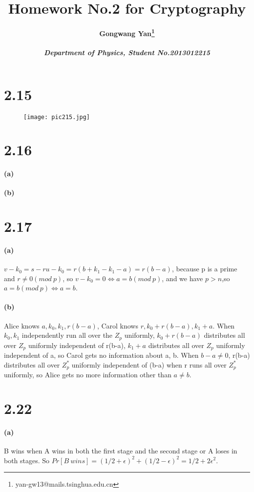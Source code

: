 \documentclass{article}
\author{\bf{Gongwang Yan}\footnote{yan-gw13@mails.tsinghua.edu.cn}
\\
\\ \emph{Department of Physics, Student No.2013012215}  }
\date{}
\title{\bf{Homework No.2 for Cryptography}}
\begin{document}
\maketitle
\section*{2.15}
\begin{figure}[htbp]
  \texttt{[image: pic215.jpg]}
\end{figure}
\section*{2.16}
\paragraph{(a)}

\paragraph{(b)}

\section*{2.17}
\paragraph{(a)}
$v-k_0=s-ru-k_0=r(b+k_1-k_1-a)=r(b-a)$, because p is a prime and $r\neq 0(mod\ p)$, so $v-k_0=0\Leftrightarrow a=b(mod\ p)$, and we have $p>n$,so $a=b(mod\ p)\Leftrightarrow a=b$.
\paragraph{(b)}
Alice knows $a,k_0,k_1,r(b-a)$, Carol knows $r,k_0+r(b-a),k_1+a$. When $k_0,k_1$ independently run all over the $Z_p$ uniformly, $k_0+r(b-a)$ distributes all over $Z_p$ uniformly independent of r(b-a), $k_1+a$ distributes all over $Z_p$ uniformly independent of a, so Carol gets no information about a, b. When $b-a\neq 0$, r(b-a) distributes all over $Z^*_p$ uniformly independent of (b-a) when r runs all over $Z^*_p$ uniformly, so Alice gets no more information other than $a\neq b$.
\section*{2.22}
\paragraph{(a)}
B wins when A wins in both the first stage and the second stage or A loses in both stages. So $Pr[B\ wins]=(1/2+\epsilon)^2+(1/2-\epsilon)^2=1/2+2\epsilon^2$.
\end{document}
